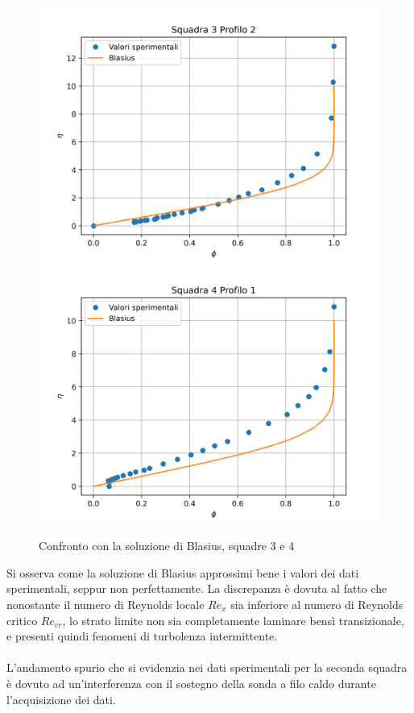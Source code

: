 \begin{figure}[H]
    \centering
    \includegraphics[width=.49\textwidth]{images/9/sq3p2_blasius.png}
    \includegraphics[width=.49\textwidth]{images/9/sq4p1_blasius.png}
    \caption{Confronto con la soluzione di Blasius, squadre 3 e 4}
\end{figure}

\noindent Si osserva come la soluzione di Blasius approssimi bene i valori dei dati sperimentali, seppur non perfettamente. La discrepanza è dovuta al fatto che nonostante il numero di Reynolds locale $Re_x$ sia inferiore al numero di Reynolds critico $Re_{cr}$, lo strato limite non sia completamente laminare bensì transizionale, e presenti quindi fenomeni di turbolenza intermittente.\\\\
L'andamento spurio che si evidenzia nei dati sperimentali per la seconda squadra è dovuto ad un'interferenza con il sostegno della sonda a filo caldo durante l'acquisizione dei dati.

